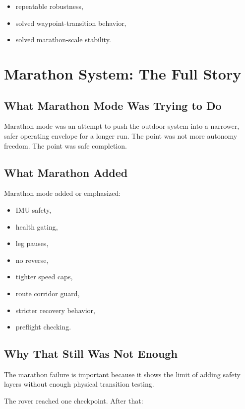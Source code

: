 \documentclass[11pt]{article}
\begin{document}
\begin{itemize}[nosep]
  \item repeatable robustness,
  \item solved waypoint-transition behavior,
  \item solved marathon-scale stability.
\end{itemize}

\section{Marathon System: The Full Story}

\subsection{What Marathon Mode Was Trying to Do}

Marathon mode was an attempt to push the outdoor system into a narrower, safer
operating envelope for a longer run. The point was not more autonomy freedom. The
point was safe completion.

\subsection{What Marathon Added}

Marathon mode added or emphasized:

\begin{itemize}[nosep]
  \item IMU safety,
  \item health gating,
  \item leg pauses,
  \item no reverse,
  \item tighter speed caps,
  \item route corridor guard,
  \item stricter recovery behavior,
  \item preflight checking.
\end{itemize}

\subsection{Why That Still Was Not Enough}

The marathon failure is important because it shows the limit of adding safety
layers without enough physical transition testing.

The rover reached one checkpoint. After that:
\end{document}
